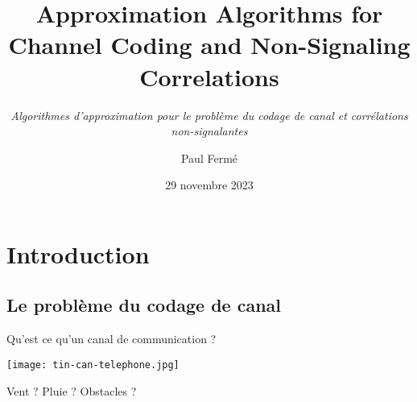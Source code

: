 \documentclass{beamer}
\title{Approximation Algorithms for Channel Coding and Non-Signaling Correlations}
\subtitle{\textit{Algorithmes d'approximation pour le problème du codage de canal et corrélations non-signalantes}}
\author{Paul Fermé}
\institute{ENS de Lyon}
\date{29 novembre 2023}
\theoremstyle{definition}
\theoremstyle{remark}
\begin{document}

\begin{frame}
  \titlepage
\end{frame}


\section{Introduction}
\subsection{Le problème du codage de canal}
\begin{frame}{Qu'est ce qu'un canal de communication ?}
  \pause
  \begin{center}
    \texttt{[image: tin-can-telephone.jpg]}
    
      \pause
      Vent ? Pluie ? Obstacles ?
  \end{center}
\end{frame}
\end{document}

